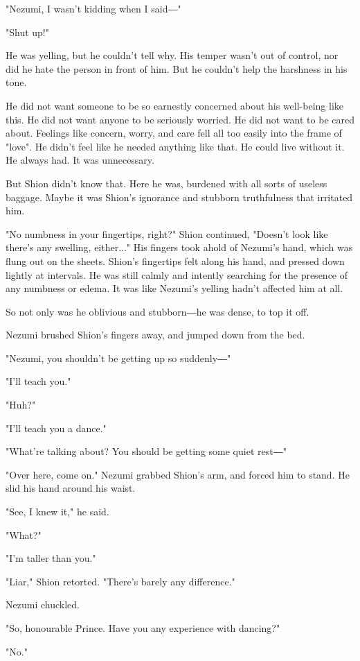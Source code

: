 "Nezumi, I wasn't kidding when I said―"

"Shut up!"

He was yelling, but he couldn't tell why. His temper wasn't out of
control, nor did he hate the person in front of him. But he couldn't
help the harshness in his tone.

He did not want someone to be so earnestly concerned about his
well-being like this. He did not want anyone to be seriously worried. He
did not want to be cared about. Feelings like concern, worry, and care
fell all too easily into the frame of "love". He didn't feel like he
needed anything like that. He could live without it. He always had. It
was unnecessary.

But Shion didn't know that. Here he was, burdened with all sorts of
useless baggage. Maybe it was Shion's ignorance and stubborn
truthfulness that irritated him.

"No numbness in your fingertips, right?" Shion continued, "Doesn't look
like there's any swelling, either..." His fingers took ahold of Nezumi's
hand, which was flung out on the sheets. Shion's fingertips felt along
his hand, and pressed down lightly at intervals. He was still calmly and
intently searching for the presence of any numbness or edema. It was
like Nezumi's yelling hadn't affected him at all.

So not only was he oblivious and stubborn―he was dense, to top it off.

Nezumi brushed Shion's fingers away, and jumped down from the bed.

"Nezumi, you shouldn't be getting up so suddenly―"

"I'll teach you."

"Huh?"

"I'll teach you a dance."

"What're talking about? You should be getting some quiet rest―"

"Over here, come on." Nezumi grabbed Shion's arm, and forced him to
stand. He slid his hand around his waist.

"See, I knew it," he said.

"What?"

"I'm taller than you."

"Liar," Shion retorted. "There's barely any difference."

Nezumi chuckled.

"So, honourable Prince. Have you any experience with dancing?"

"No."

